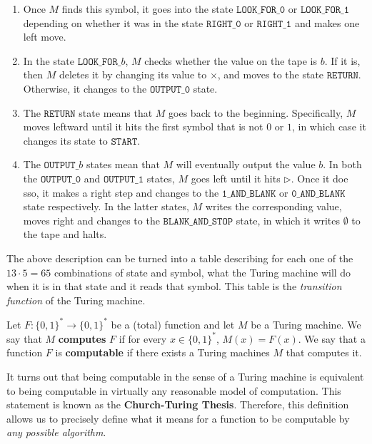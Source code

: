 \documentclass{article}
\begin{document}
\begin{example}
\begin{enumerate}
      \item Once $M$ finds this symbol, it goes into the state $\texttt{LOOK\_FOR\_0}$ or $\texttt{LOOK\_FOR\_1}$ depending on whether it was in the state $\texttt{RIGHT\_0}$ or $\texttt{RIGHT\_1}$ and makes one left move. 
      \item In the state $\texttt{LOOK\_FOR\_}b$, $M$ checks whether the value on the tape is $b$. If it is, then $M$ deletes it by changing its value to $\times$, and moves to the state $\texttt{RETURN}$. Otherwise, it changes to the $\texttt{OUTPUT\_0}$ state. 
      \item The $\texttt{RETURN}$ state means that $M$ goes back to the beginning. Specifically, $M$ moves leftward until it hits the first symbol that is not $0$ or $1$, in which case it changes its state to $\texttt{START}$. 
      \item The $\texttt{OUTPUT\_}b$ states mean that $M$ will eventually output the value $b$. In both the $\texttt{OUTPUT\_0}$ and $\texttt{OUTPUT\_1}$ states, $M$ goes left until it hits $\triangleright$. Once it doe sso, it makes a right step and changes to the $\texttt{1\_AND\_BLANK}$ or $\texttt{0\_AND\_BLANK}$ state respectively. In the latter states, $M$ writes the corresponding value, moves right and changes to the $\texttt{BLANK\_AND\_STOP}$ state, in which it writes $\emptyset$ to the tape and halts. 
  \end{enumerate}
  The above description can be turned into a table describing for each one of the $13 \cdot 5 = 65$ combinations of state and symbol, what the Turing machine will do when it is in that state and it reads that symbol. This table is the \textit{transition function} of the Turing machine. 
  \end{example}

  \begin{definition}
  Let $F: \{0,1\}^* \longrightarrow \{0,1\}^*$ be a (total) function and let $M$ be a Turing machine. We say that $M$ \textbf{computes} $F$ if for every $x \in \{0,1\}^*$, $M(x) = F(x)$. We say that a function $F$ is \textbf{computable} if there exists a Turing machines $M$ that computes it. 
  \end{definition}

  It turns out that being computable in the sense of a Turing machine is equivalent to being computable in virtually any reasonable model of computation. This statement is known as the \textbf{Church-Turing Thesis}. Therefore, this definition allows us to precisely define what it means for a function to be computable by \textit{any possible algorithm}. 
\end{document}
